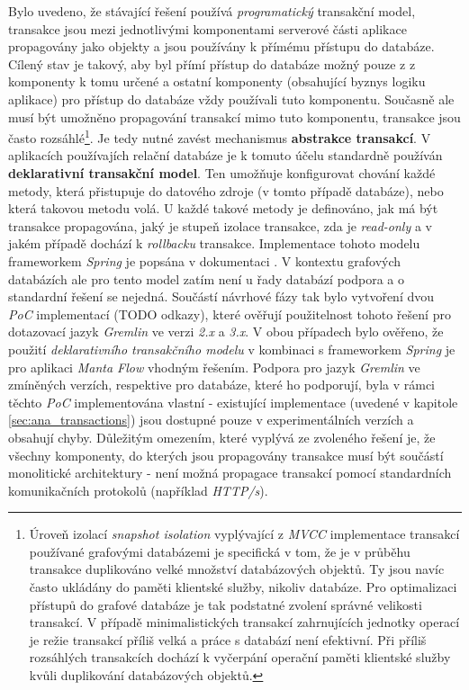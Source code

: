 Bylo uvedeno, že stávající řešení používá \textit{programatický} transakční model, transakce jsou mezi jednotlivými komponentami serverové části aplikace propagovány jako objekty a jsou používány k přímému přístupu do databáze. Cílený stav je takový, aby byl přímí přístup do databáze možný pouze z z komponenty k tomu určené a ostatní komponenty (obsahující byznys logiku aplikace) pro přístup do databáze vždy používali tuto komponentu. Současně ale musí být umožněno propagování transakcí mimo tuto komponentu, transakce jsou často rozsáhlé\footnote{Úroveň izolací \textit{snapshot isolation} vyplývající z \textit{MVCC} implementace transakcí používané grafovými databázemi je specifická v tom, že je v průběhu transakce duplikováno velké množství databázových objektů. Ty jsou navíc často ukládány do paměti klientské služby, nikoliv databáze. Pro optimalizaci přístupů do grafové databáze je tak podstatné zvolení správné velikosti transakcí. V případě minimalistických transakcí zahrnujících jednotky operací je režie transakcí příliš velká a práce s databází není efektivní. Při příliš rozsáhlých transakcích dochází k vyčerpání operační paměti klientské služby kvůli duplikování databázových objektů.}. Je tedy nutné zavést mechanismus \textbf{abstrakce transakcí}.
V aplikacích používajích relační databáze je k tomuto účelu standardně používán \textbf{deklarativní transakční model}. Ten umožňuje konfigurovat chování každé metody, která přistupuje do datového zdroje (v tomto případě databáze), nebo která takovou metodu volá. U každé takové metody je definováno, jak má být transakce propagována, jaký je stupeň izolace transakce, zda je \textit{read-only} a v jakém případě dochází k \textit{rollbacku} transakce. Implementace tohoto modelu frameworkem \textit{Spring} je popsána v dokumentaci \cite{SpringTransactions}.
V kontextu grafových databázích ale pro tento model zatím není u řady databází podpora a o standardní řešení se nejedná. Součástí návrhové fázy tak bylo vytvoření dvou \textit{PoC} implementací (TODO odkazy), které ověřují použitelnost tohoto řešení pro dotazovací jazyk \textit{Gremlin} ve verzi \textit{2.x} a \textit{3.x}. V obou případech bylo ověřeno, že použití \textit{deklarativního transakčního modelu} v kombinaci s frameworkem \textit{Spring} je pro aplikaci \textit{Manta Flow} vhodným řešením. Podpora pro jazyk \textit{Gremlin} ve zmíněných verzích, respektive pro databáze, které ho podporují, byla v rámci těchto \textit{PoC} implementována vlastní - existující implementace (uvedené v kapitole \ref{sec:ana_transactions}) jsou dostupné pouze v experimentálních verzích a obsahují chyby.
Důležitým omezením, které vyplývá ze zvoleného řešení je, že všechny komponenty, do kterých jsou propagovány transakce musí být součástí monolitické architektury - není možná propagace transakcí pomocí standardních komunikačních protokolů (například \textit{HTTP/s}).

